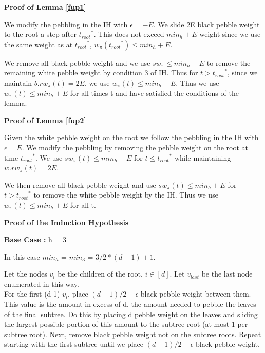\documentclass[12pt]{article}
\newenvironment{proofL}{\hspace{.4em}}
                      {\hspace{\fill}{$\blacksquare$} \smallskip}
\newcommand{\troots}{{t_{root}}^*}
\begin{document}
\noindent
 {\bf Proof of Lemma \ref{fup1}}\begin{proofL} 
 
We modify the pebbling in the IH with $\epsilon=-E$. We slide 2E black pebble weight to the root a step after $\troots$. This does not exceed $min_h+E$ weight since we use the same weight as at $\troots$, $w_\pi(\troots) \leq min_h +E$. 

We remove all black pebble weight and we use $sw_\pi \leq min_h-E$ to remove the remaining white pebble weight by condition 3 of IH. Thus for $t > \troots$, since we maintain $b.rw_{\pi}(t) = 2E$, we use $w_\pi(t) \leq min_h+E$. Thus we use $w_\pi(t) \leq min_h+E$ for all times t and have satisfied the conditions of the lemma.
 
 \end{proofL} 

\noindent
 {\bf Proof of Lemma \ref{fup2}}\begin{proofL} 
 
Given the white pebble weight on the root we follow the pebbling in the IH with $\epsilon=E$. We modify the pebbling by removing the pebble weight on the root at time $\troots$. We use $sw_\pi(t) \leq min_h-E$ for $t \leq \troots$ while maintaining $w.rw_{\pi}(t) = 2E$. 

We then remove all black pebble weight and use $sw_\pi(t) \leq min_h+E$ for $t > \troots$ to remove the white pebble weight by the IH. Thus we use $w_\pi(t) \leq min_h+E$ for all t.
 
 \end{proofL} 




\noindent
{\bf Proof of the Induction Hypothesis}

\noindent
{\bf Base Case :} h = 3

In this case $min_h$ = $min_3$ = $3/2*(d-1) + 1$.

Let the nodes $v_i$ be the children of the root, $i \in [d]$. Let $v_{last}$ be the last node enumerated in this way.\\

For the first (d-1) $v_i$, place $(d-1)/2-\epsilon$ black pebble weight between them. This value is the amount in excess of d, the amount needed to pebble the leaves of the final subtree. Do this by placing d pebble weight on the leaves and sliding the largest possible portion of this amount to the subtree root (at most 1 per subtree root). Next, remove black pebble weight not on the subtree roots. Repeat starting with the first subtree until we place $(d-1)/2-\epsilon$ black pebble weight.
\end{document}
